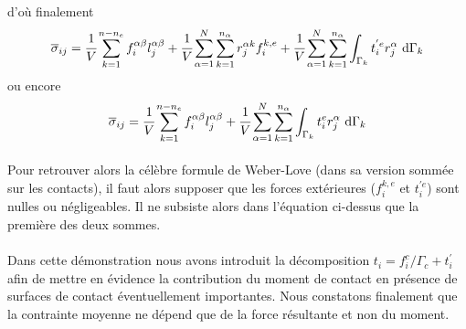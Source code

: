 d'où finalement
\begin{equation}\label{annexe:love_weber}
	\overline{\sigma}_{ij}
	= \cfrac{1}{V} \sum_{k=1}^{n-n_e} f_i^{\alpha\beta} l_j^{\alpha\beta}
	+ \cfrac{1}{V} \sum_{\alpha=1}^N \sum_{k=1}^{n_\alpha} r_j^{\alpha k} f_i^{k,e}
	+ \cfrac{1}{V} \sum_{\alpha=1}^N \sum_{k=1}^{n_\alpha} \int_{\Gamma_k} t_i^{'e} r_j^\alpha\ \mathrm{d} \Gamma_k
\end{equation}
ou encore
\begin{equation}\label{annexe:love_weber_2}
	\overline{\sigma}_{ij}
	= \cfrac{1}{V} \sum_{k=1}^{n-n_e} f_i^{\alpha\beta} l_j^{\alpha\beta}
	+ \cfrac{1}{V} \sum_{\alpha=1}^N \sum_{k=1}^{n_\alpha} \int_{\Gamma_k} t_i^{e} r_j^\alpha\ \mathrm{d} \Gamma_k
\end{equation}
\paragraph{}
Pour retrouver alors la célèbre formule de Weber-Love \citep{weber_recherches_1966,love_treatise_1927} (dans sa version sommée sur les contacts), il faut alors supposer que les forces extérieures ($f_i^{k,e}$ et $t_i^{'e}$) sont nulles ou négligeables. Il ne subsiste alors dans l'équation ci-dessus que la première des deux sommes.
\paragraph{}
Dans cette démonstration nous avons introduit la décomposition $t_i = f_i^c/\Gamma_c + t_i^{'}$ afin de mettre en évidence la contribution du moment de contact en présence de surfaces de contact éventuellement importantes. Nous constatons finalement que la contrainte moyenne ne dépend que de la force résultante et non du moment.